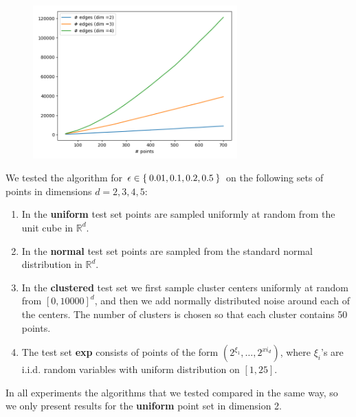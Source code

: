 \documentclass[a4paper,USenglish]{socg-lipics-v2018}
\newcommand{\eps}{\epsilon}
\begin{document}
\begin{figure}[ht]
    \label{fig:blind-greedy-only}
    \includegraphics[width=0.7\textwidth]{blind-greedy-dims.png}
    \caption{}
\end{figure}



We tested the algorithm for $\eps \in \Set{0.01, 0.1, 0.2, 0.5}$ on the following sets of points in dimensions $d = 2,3,4,5$:
\begin{enumerate}
    \item In the \textbf{uniform} test set points are sampled uniformly at
        random from the unit cube in $\mathbb{R}^d$.
    \item In the \textbf{normal} test set points are sampled from the standard
        normal distribution in $\mathbb{R}^d$.
    \item In the \textbf{clustered} test set we first sample cluster centers uniformly 
        at random from $[0,10000]^d$, and then we add normally distributed noise around
        each of the centers. The number of clusters is chosen so that each cluster
        contains 50 points.
    \item The test set \textbf{exp} consists of points of the form $(2^{\xi_1}, \dots, 2^{xi_d})$,
        where $\xi_i$'s are i.i.d. random variables with uniform distribution on $[1,25]$.
\end{enumerate}
In all experiments the algorithms that we tested compared in the same way,
so we only present results for the \textbf{uniform} point set in dimension 2.
\end{document}

